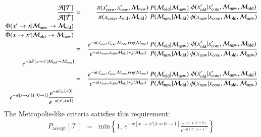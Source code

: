 \begin{eqnarray}
\frac{\mathcal{A}[\mathcal{T}]}{\mathcal{A}[\tilde{\mathcal{T}}]} &=& \frac{\pi(x'_\mathrm{core}, x'_\mathrm{new}, \mathcal{M}_\mathrm{new})}{\pi(x_\mathrm{core}, x_\mathrm{old}, \mathcal{M}_\mathrm{old})} \frac{P(\mathcal{M}_\mathrm{old} | \mathcal{M}_\mathrm{new})}{P(\mathcal{M}_\mathrm{new} | \mathcal{M}_\mathrm{old})} \frac{\phi(x'_\mathrm{old} | x'_\mathrm{core}, \mathcal{M}_\mathrm{new}, \mathcal{M}_\mathrm{old})}{\phi(x_\mathrm{new} | x_\mathrm{core}, \mathcal{M}_\mathrm{old}, \mathcal{M}_\mathrm{new})} \nonumber \\ 
\frac{\Phi(x' \rightarrow x | \mathcal{M}_\mathrm{new} \rightarrow \mathcal{M}_\mathrm{old})} {\Phi(x \rightarrow x' | \mathcal{M}_\mathrm{old} \rightarrow \mathcal{M}_\mathrm{new})} \notag \nonumber \\
%
&=& \frac{e^{-u(x'_\mathrm{core}, x'_\mathrm{new}, \mathcal{M}_\mathrm{new}) + g(\mathcal{M}_\mathrm{new})}}{e^{-u(x_\mathrm{core}, x_\mathrm{old}, \mathcal{M}_\mathrm{old}) + g(\mathcal{M}_\mathrm{old})}} \frac{P(\mathcal{M}_\mathrm{old} | \mathcal{M}_\mathrm{new})}{P(\mathcal{M}_\mathrm{new} | \mathcal{M}_\mathrm{old})} \frac{\phi(x'_\mathrm{old} | x'_\mathrm{core}, \mathcal{M}_\mathrm{new}, \mathcal{M}_\mathrm{old})}{\phi(x_\mathrm{new} | x_\mathrm{core}, \mathcal{M}_\mathrm{old}, \mathcal{M}_\mathrm{new})} \nonumber \\ 
e^{-\Delta S[x \rightarrow x' | \mathcal{M}_\mathrm{old} \rightarrow \mathcal{M}_\mathrm{new}]} \notag \nonumber \\
%
&=& \frac{e^{-u(x'_\mathrm{core}, x'_\mathrm{new}, \mathcal{M}_\mathrm{new}) + g(\mathcal{M}_\mathrm{new})}}{e^{-u(x_\mathrm{core}, x_\mathrm{old}, \mathcal{M}_\mathrm{old}) + g(\mathcal{M}_\mathrm{old})}} \frac{P(\mathcal{M}_\mathrm{old} | \mathcal{M}_\mathrm{new})}{P(\mathcal{M}_\mathrm{new} | \mathcal{M}_\mathrm{old})} \frac{\phi(x'_\mathrm{old} | x'_\mathrm{core}, \mathcal{M}_\mathrm{new}, \mathcal{M}_\mathrm{old})}{\phi(x_\mathrm{new} | x_\mathrm{core}, \mathcal{M}_\mathrm{old}, \mathcal{M}_\mathrm{new})} \nonumber \\  
e^{-w[x \rightarrow x' | \lambda = 0 \rightarrow 1]} \frac{e^{-u(x, \lambda=0)}}{e^{-u(x', \lambda=1)}} \label{equation:hybrid-acceptance-criteria}
\end{eqnarray}
%
The Metropolis-like criteria satisfies this requirement:
%
\begin{eqnarray}
P_\mathrm{accept}[\mathcal{T}] &=& \mathrm{min} \left\{ 1, \, e^{-w[x \rightarrow x' | \lambda = 0 \rightarrow 1]} \frac{e^{-u(x, \lambda=0)}}{e^{-u(x', \lambda=1)}} \right\}
\end{eqnarray}
%